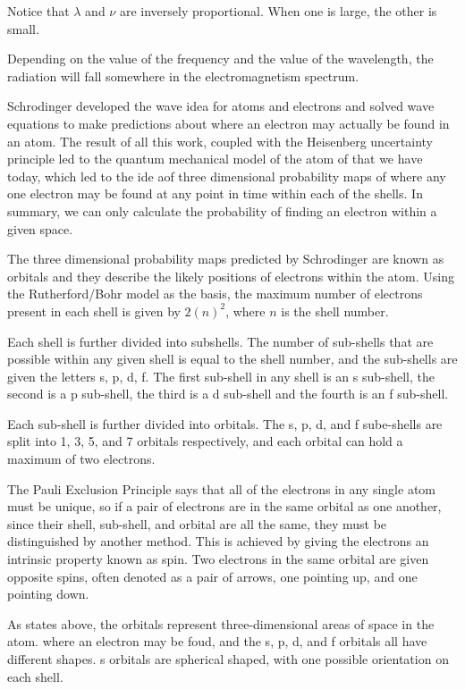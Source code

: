 \documentclass[../chem.tex]{subfiles}
\begin{document}
Notice that $\lambda$ and $\nu$ are inversely proportional. When one is large, the other is small.

Depending on the value of the frequency and the value of the wavelength, the radiation will fall somewhere in the electromagnetism spectrum.

Schrodinger developed the wave idea for atoms and electrons and solved wave equations to make predictions about where an electron may actually be found in an atom.
The result of all this work, coupled with the Heisenberg uncertainty principle led to the quantum mechanical model of the atom of that we have today, which led to the ide aof three 
dimensional probability maps of where any one electron may be found at any point in time within each of the shells. In summary, we can only calculate the probability 
of finding an electron within a given space.

The three dimensional probability maps predicted by Schrodinger are known as orbitals and they describe the likely positions of electrons within the atom.
Using the Rutherford/Bohr model as the basis, the maximum number of electrons present in each shell is given by $2(n)^2$, where $n$ is the shell number.

Each shell is further divided into subshells. The number of sub-shells that are possible within any given shell is equal to the shell number, and the sub-shells are given the letters s, p, d, f.
The first sub-shell in any shell is an s sub-shell, the second is a p sub-shell, the third is a d sub-shell and the fourth is an f sub-shell.

Each sub-shell is further divided into orbitals. The s, p, d, and f sube-shells are split into 1, 3, 5, and 7 orbitals respectively, and each orbital can hold a maximum of two electrons. 

The Pauli Exclusion Principle says that all of the electrons in any single atom must be unique, so if a pair of electrons are in the same orbital as one another, since their shell, sub-shell, and orbital 
are all the same, they must be distinguished by another method. This is achieved by giving the electrons an intrinsic property known as spin. Two electrons 
in the same orbital are given opposite spins, often denoted as a pair of arrows, one pointing up, and one pointing down.

As states above, the orbitals represent three-dimensional areas of space in the atom. where an electron may be foud, and the s, p, d, and f orbitals all have different shapes. s orbitals are spherical shaped, with one possible orientation on each shell.
\end{document}
